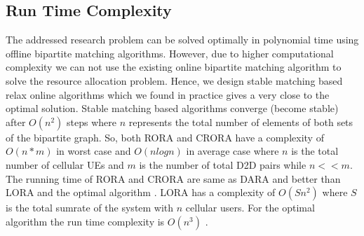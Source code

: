 \documentclass[times]{dacauth}
\begin{document}
\subsection{Run Time Complexity}
\smallskip
\noindent
The addressed research problem can be solved optimally in polynomial time using offline bipartite matching algorithms. However, due to higher computational complexity we can not use the existing online bipartite matching algorithm to solve the resource allocation problem. Hence, we design stable matching based relax online algorithms which we found in practice gives a very close to the optimal solution. Stable matching based algorithms converge (become stable) after $O(n^2)$ \cite{kleinberg2011algorithm} steps where $n$ represents the total number of elements of both sets of the bipartite graph. So, both  RORA and CRORA have a complexity of  $O(n*m)$ in worst case and  $O(nlogn)$ in average case where $n$ is the total number of cellular UEs and $m$ is the number of total D2D pairs while $n<<m$.  The running time of RORA and CRORA are same as DARA \cite{dara} and better than LORA \cite{lora} and the optimal algorithm \cite{hungarian}. LORA has a complexity of  $O(Sn^2)$ where $S$ is the total sumrate of the system with $n$ cellular users. For the optimal algorithm the run time complexity is  $O(n^3)$ . 


\end{document}
